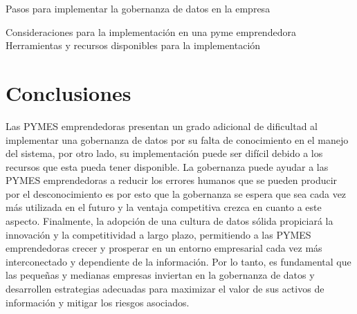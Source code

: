 \documentclass[
  letterpaper,
  DIV=11,
  numbers=noendperiod]{scrreprt}
\begin{document}
Pasos para implementar la gobernanza de datos en la empresa

Consideraciones para la implementación en una pyme emprendedora
Herramientas y recursos disponibles para la implementación


\hypertarget{conclusiones-1}{%
\chapter{Conclusiones}\label{conclusiones-1}}

Las PYMES emprendedoras presentan un grado adicional de dificultad al
implementar una gobernanza de datos por su falta de conocimiento en el
manejo del sistema, por otro lado, su implementación puede ser difícil
debido a los recursos que esta pueda tener disponible. La gobernanza
puede ayudar a las PYMES emprendedoras a reducir los errores humanos que
se pueden producir por el desconocimiento es por esto que la gobernanza
se espera que sea cada vez más utilizada en el futuro y la ventaja
competitiva crezca en cuanto a este aspecto. Finalmente, la adopción de
una cultura de datos sólida propiciará la innovación y la competitividad
a largo plazo, permitiendo a las PYMES emprendedoras crecer y prosperar
en un entorno empresarial cada vez más interconectado y dependiente de
la información. Por lo tanto, es fundamental que las pequeñas y medianas
empresas inviertan en la gobernanza de datos y desarrollen estrategias
adecuadas para maximizar el valor de sus activos de información y
mitigar los riesgos asociados.
\end{document}
